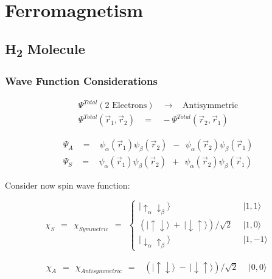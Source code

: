 \documentclass[10pt]{report}
\numberwithin{equation}{chapter}
\begin{document}
\section{Ferromagnetism}

\subsection{H\textsubscript{2} Molecule}

\subsubsection{Wave Function Considerations}

\begin{align}
  \Psi^{Total}(\text{2 Electrons})   ~~~~ \rightarrow ~~~~ \text{Antisymmetric}\\
  \Psi^{Total}(\vec{r}_1, \vec{r}_2) ~~~~ = ~~~~ - \Psi^{Total}(\vec{r}_2, \vec{r}_1)
\end{align}


\begin{align}
  \Psi_A ~~~~ = ~~~~ \psi_\alpha(\vec{r}_1) \psi_\beta(\vec{r}_2) ~~ - ~~ \psi_\alpha(\vec{r}_2)\psi_\beta(\vec{r}_1)\\
  \Psi_S ~~~~ = ~~~~ \psi_\alpha(\vec{r}_1) \psi_\beta(\vec{r}_2) ~~ + ~~ \psi_\alpha(\vec{r}_2)\psi_\beta(\vec{r}_1)
\end{align}



Consider now spin wave function:

\begin{equation}
  \chi_S ~~ = ~~ \chi_{Symmetric} ~~ = ~~ \left\{ 
  \begin{array}{ll}
    | \uparrow_\alpha \downarrow_\beta \rangle &~~ | 1,1 \rangle\\
    \left( | \uparrow \downarrow \rangle ~+~ | \downarrow \uparrow \rangle \right)/ \sqrt{2} &~~ | 1,0 \rangle\\
    | \downarrow_\alpha \uparrow_\beta \rangle &~~ | 1,-1 \rangle
  \end{array}\right.
\end{equation}

\begin{equation}
  \chi_A ~~ = ~~ \chi_{Antisymmetric} ~~ = ~~ 
  \begin{array}{ll}
    \left(| \uparrow \downarrow \rangle ~-~ | \downarrow \uparrow \rangle \right) / \sqrt{2} &~~ | 0,0 \rangle 
  \end{array}
\end{equation}
\end{document}
